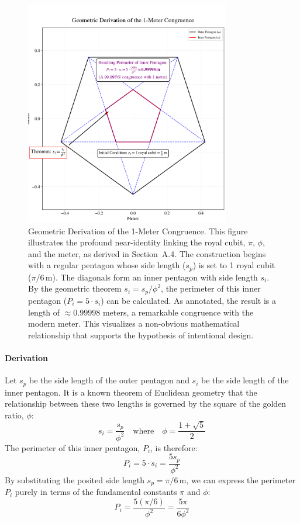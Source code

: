 \documentclass[11pt]{article}
\begin{document}
\begin{figure}[h!]
\centering
\includegraphics[width=0.8\textwidth]{figures/congruence-penta-fig.png}
\caption{Geometric Derivation of the 1-Meter Congruence. This figure illustrates the profound near-identity linking the royal cubit, $\pi$, $\phi$, and the meter, as derived in Section~A.4. The construction begins with a regular pentagon whose side length ($s_p$) is set to 1 royal cubit ($\pi/6\,\text{m}$). The diagonals form an inner pentagon with side length $s_i$. By the geometric theorem $s_i = s_p / \phi^2$, the perimeter of this inner pentagon ($P_i = 5 \cdot s_i$) can be calculated. As annotated, the result is a length of $\approx 0.99998$ meters, a remarkable congruence with the modern meter. This visualizes a non-obvious mathematical relationship that supports the hypothesis of intentional design.}
\label{fig:congruence_penta}
\end{figure}

\paragraph{Derivation}

Let $s_p$ be the side length of the outer pentagon and $s_i$ be the side length of the inner pentagon. It is a known theorem of Euclidean geometry that the relationship between these two lengths is governed by the square of the golden ratio, $\phi$:
\[
s_i = \frac{s_p}{\phi^2} \quad \text{where} \quad \phi = \frac{1 + \sqrt{5}}{2}
\]
The perimeter of this inner pentagon, $P_i$, is therefore:
\[
P_i = 5 \cdot s_i = \frac{5s_p}{\phi^2}
\]
By substituting the posited side length $s_p = \pi/6\,\text{m}$, we can express the perimeter $P_i$ purely in terms of the fundamental constants $\pi$ and $\phi$:
\[
P_i = \frac{5(\pi/6)}{\phi^2} = \frac{5\pi}{6\phi^2}
\]
\end{document}

